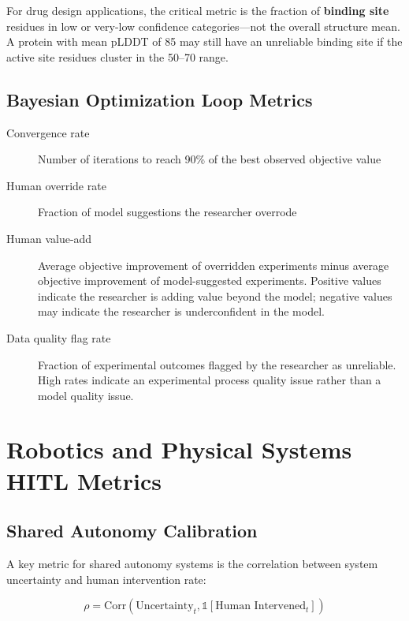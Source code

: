For drug design applications, the critical metric is the fraction of \textbf{binding site} residues in low or very-low confidence categories---not the overall structure mean. A protein with mean pLDDT of 85 may still have an unreliable binding site if the active site residues cluster in the 50--70 range.

\subsection{Bayesian Optimization Loop Metrics}

\begin{description}
    \item[Convergence rate] Number of iterations to reach 90\% of the best observed objective value
    \item[Human override rate] Fraction of model suggestions the researcher overrode
    \item[Human value-add] Average objective improvement of overridden experiments minus average objective improvement of model-suggested experiments. Positive values indicate the researcher is adding value beyond the model; negative values may indicate the researcher is underconfident in the model.
    \item[Data quality flag rate] Fraction of experimental outcomes flagged by the researcher as unreliable. High rates indicate an experimental process quality issue rather than a model quality issue.
\end{description}

\section{Robotics and Physical Systems HITL Metrics}

\subsection{Shared Autonomy Calibration}

A key metric for shared autonomy systems is the correlation between system uncertainty and human intervention rate:

\begin{equation}
\rho = \text{Corr}(\text{Uncertainty}_t, \mathbb{1}[\text{Human Intervened}_t])
\label{eq:shared-autonomy-corr}
\end{equation}

